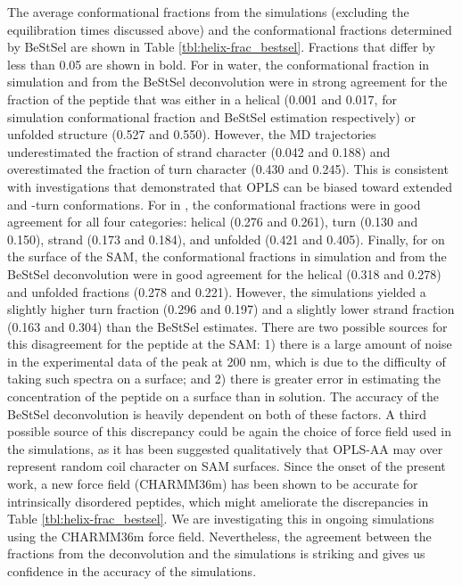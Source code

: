 The average conformational fractions from the simulations (excluding the equilibration times discussed above) and the conformational fractions determined by BeStSel are shown in Table \ref{tbl:helix-frac_bestsel}. 
Fractions that differ by less than 0.05 are shown in bold. 
For \pep{} in water, the conformational fraction in simulation and from the BeStSel deconvolution were in strong agreement for the fraction of the peptide that was either in a helical (0.001 and 0.017, for simulation conformational fraction and BeStSel estimation respectively) or unfolded structure (0.527 and 0.550). 
However, the MD trajectories underestimated the fraction of strand character (0.042 and 0.188) and overestimated the fraction of turn character (0.430 and 0.245). 
This is consistent with investigations that demonstrated that OPLS can be biased toward extended and \textbeta{}-turn conformations\cite{Best2011, Smith2015}. 
For \pep{} in \tbawat{}, the conformational fractions were in good agreement for all four categories: helical (0.276 and 0.261), turn (0.130 and 0.150), strand (0.173 and 0.184), and unfolded (0.421 and 0.405). 
Finally, for \pep{} on the surface of the SAM, the conformational fractions in simulation and from the BeStSel deconvolution were in good agreement for the helical (0.318 and 0.278) and unfolded fractions (0.278 and 0.221). 
However, the simulations yielded a slightly higher turn fraction (0.296 and 0.197) and a slightly lower strand fraction (0.163 and 0.304) than the BeStSel estimates. 
There are two possible sources for this disagreement for the peptide at the SAM: 
1) there is a large amount of noise in the experimental data of the peak at 200 nm, which is due to the difficulty of taking such spectra on a surface; and 
2) there is greater error in estimating the concentration of the peptide on a surface than in solution. 
The accuracy of the BeStSel deconvolution is heavily dependent on both of these factors. 
A third possible source of this discrepancy could be again the choice of force field used in the simulations, as it has been suggested qualitatively that OPLS-AA may over represent random coil character on SAM surfaces\cite{Collier2012}. 
Since the onset of the present work, a new force field (CHARMM36m) has been shown to be accurate for intrinsically disordered peptides\cite{Huang2017}, which might ameliorate the discrepancies in Table \ref{tbl:helix-frac_bestsel}. 
We are investigating this in ongoing simulations using the CHARMM36m force field. 
Nevertheless, the agreement between the fractions from the deconvolution and the simulations is striking and gives us confidence in the accuracy of the simulations.

